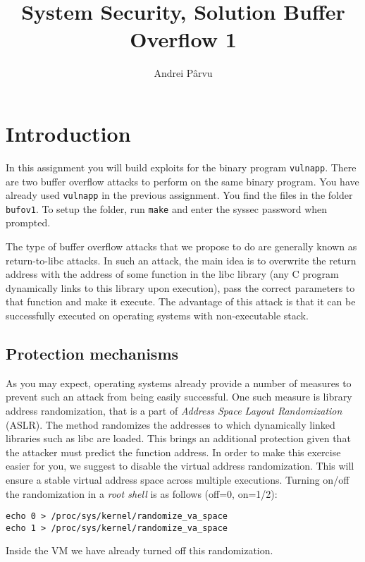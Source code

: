 \documentclass[a4paper,11pt]{article}
\title{System Security,
\ifsolution Solution \else \fi
Buffer Overflow 1}
\author{Andrei Pârvu}
\begin{document}
\maketitle

\section*{Introduction}

In this assignment you will build exploits for the binary program {\tt vulnapp}.
There are two buffer overflow attacks to perform on the same binary program. You
have already used {\tt vulnapp} in the previous assignment. You find the files
in the folder \texttt{bufov1}. To setup the folder, run \texttt{make} and
enter the syssec password when prompted.

The type of buffer overflow attacks that we propose to do are generally known as
return-to-libc attacks. In such an attack, the main idea is to overwrite the
return address with the address of some function in the libc library (any C
program dynamically links to this library upon execution), pass the correct
parameters to that function and make it execute. The advantage of this attack is
that it can be successfully executed on operating systems with non-executable
stack.

\subsection*{Protection mechanisms}

As you may expect, operating systems already provide a number of measures to
prevent such an attack from being easily successful. One such measure is library
address randomization, that is a part of \textit{Address Space Layout
Randomization} (ASLR). The method randomizes the addresses to which dynamically
linked libraries such as libc are loaded. This brings an additional protection
given that the attacker must predict the function address. In order to make this
exercise easier for you, we suggest to disable the virtual address
randomization. This will ensure a stable virtual address space across multiple
executions. Turning on/off the randomization in a \textit{root shell} is as
follows (off=0, on=1/2):

\begin{verbatim}
echo 0 > /proc/sys/kernel/randomize_va_space
echo 1 > /proc/sys/kernel/randomize_va_space
\end{verbatim}

Inside the VM we have already turned off this randomization.
\end{document}
